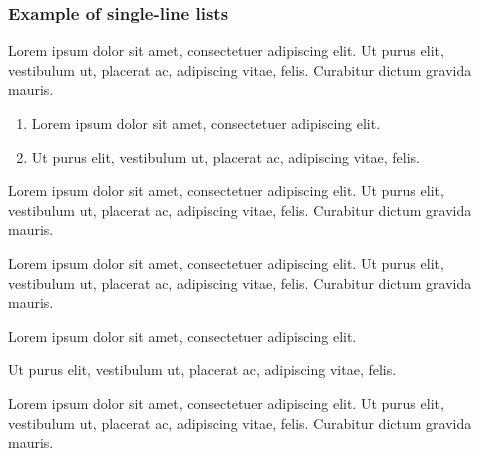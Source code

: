 \documentclass[draft*,nochapters]{aaltoseries}
\begin{document}
\subsubsection{Example of single-line lists}
Lorem ipsum dolor sit amet, consectetuer adipiscing elit. Ut purus elit,  vestibulum ut, placerat ac, adipiscing vitae, felis. Curabitur dictum gravida mauris.
\begin{enumerate}
\setlength{\itemsep}{0mm}
\item Lorem ipsum dolor sit amet, consectetuer adipiscing elit.
\item Ut purus elit,  vestibulum ut, placerat ac, adipiscing vitae, felis.
\end{enumerate}
Lorem ipsum dolor sit amet, consectetuer adipiscing elit. Ut purus elit,  vestibulum ut, placerat ac, adipiscing vitae, felis. Curabitur dictum gravida mauris.

Lorem ipsum dolor sit amet, consectetuer adipiscing elit. Ut purus elit,  vestibulum ut, placerat ac, adipiscing vitae, felis. Curabitur dictum gravida mauris.
\begin{singleenums}%
\item Lorem ipsum dolor sit amet, consectetuer adipiscing elit.
\item Ut purus elit,  vestibulum ut, placerat ac, adipiscing vitae, felis.
\end{singleenums}
Lorem ipsum dolor sit amet, consectetuer adipiscing elit. Ut purus elit,  vestibulum ut, placerat ac, adipiscing vitae, felis. Curabitur dictum gravida mauris.
\end{document}
